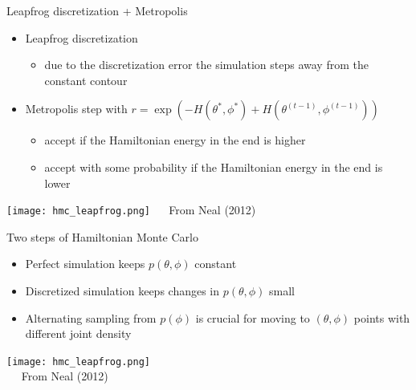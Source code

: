 \documentclass[finnish,english,t]{beamer}
\begin{document}
\begin{frame}{Leapfrog discretization + Metropolis}

  \vspace{-0.5\baselineskip}
  \begin{itemize}
  \item Leapfrog discretization
    \begin{itemize}
    \item due to the discretization error the simulation steps away
      from the constant contour
    \end{itemize}
  \item<2-> Metropolis step with
    $r=\exp\left(-H(\theta^*,\phi^*)+H(\theta^{(t-1)},\phi^{(t-1)})\right)$
    \begin{itemize}
    \item accept if the Hamiltonian energy in the end is higher 
    \item accept with some probability if the Hamiltonian energy in
      the end is lower
    \end{itemize}
  \end{itemize}
    \vspace{-0.6\baselineskip}
    \begin{center}
      \texttt{[image: hmc\_leapfrog.png]}
      {\footnotesize~~ From Neal (2012)}
    \end{center}
\end{frame}

\begin{frame}{Two steps of Hamiltonian Monte Carlo}

  \vspace{-0.6\baselineskip}
  \begin{itemize}
  \item Perfect simulation keeps $p(\theta,\phi)$ constant
  \item<2-> Discretized simulation keeps changes in
    $p(\theta,\phi)$ small
  \item<3-> Alternating sampling from $p(\phi)$ is crucial for moving
    to $(\theta,\phi)$ points with different joint density
  \end{itemize}
  
  \vspace{4.3pt}
  \texttt{[image: hmc\_leapfrog.png]}\\
      {\footnotesize~~ From Neal (2012)}

\end{frame}
\end{document}
